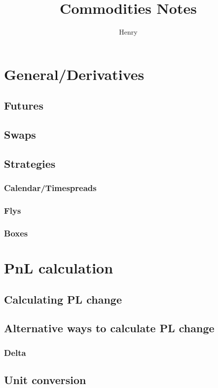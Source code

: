 \documentclass{article}
\title{Commodities Notes}
\author{Henry}
\begin{document}
\maketitle


\tableofcontents


\section{General/Derivatives}
\subsection{Futures}
\subsection{Swaps}
\subsection{Strategies}
\subsubsection{Calendar/Timespreads}
\subsubsection{Flys}
\subsubsection{Boxes}

\section{PnL calculation}
\subsection{Calculating PL change}
\subsection{Alternative ways to calculate PL change}
\subsubsection{Delta}
\subsection{Unit conversion}
\end{document}
